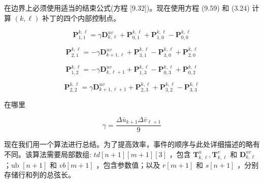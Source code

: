 \documentclass[../main.tex]{subfiles}
\begin{document}
在边界上必须使用适当的结束公式(方程 [9.32])。现在使用方程 (9.59) 和 (3.24) 计算 \(\left( {k,\ell }\right)\) 补丁的四个内部控制点。

\[
{\mathbf{P}}_{1,1}^{k,\ell } = \gamma {\mathbf{D}}_{k,\ell }^{uv} + {\mathbf{P}}_{0,1}^{k,\ell } + {\mathbf{P}}_{1,0}^{k,\ell } - {\mathbf{P}}_{0,0}^{k,\ell }
\]

\[
{\mathbf{P}}_{2,1}^{k,\ell } =  - \gamma {\mathbf{D}}_{k + 1,\ell }^{uv} + {\mathbf{P}}_{3,1}^{k,\ell } - {\mathbf{P}}_{3,0}^{k,\ell } + {\mathbf{P}}_{2,0}^{k,\ell }
\]

\[
{\mathbf{P}}_{1,2}^{k,\ell } =  - \gamma {\mathbf{D}}_{k,\ell  + 1}^{uv} + {\mathbf{P}}_{1,3}^{k,\ell } - {\mathbf{P}}_{0,3}^{k,\ell } + {\mathbf{P}}_{0,2}^{k,\ell }
\]

\[
{\mathbf{P}}_{2,2}^{k,\ell } = \gamma {\mathbf{D}}_{k + 1,\ell  + 1}^{uv} + {\mathbf{P}}_{2,3}^{k,\ell } + {\mathbf{P}}_{3,2}^{k,\ell } - {\mathbf{P}}_{3,3}^{k,\ell }
\]

在哪里

\[
\gamma  = \frac{\Delta {\bar{u}}_{k + 1}\Delta {\bar{v}}_{\ell  + 1}}{9}
\]

现在我们用一个算法进行总结。为了提高效率，事件的顺序与此处详细描述的略有不同。该算法需要局部数组: \({td}\left\lbrack  {n + 1}\right\rbrack  \left\lbrack  {m + 1}\right\rbrack  \left\lbrack  3\right\rbrack\) ，包含 \({\mathbf{T}}_{k,\ell }^{u},{\mathbf{T}}_{k,\ell }^{v}\) 和 \({\mathbf{D}}_{k,\ell }^{uv}\) ；ub \(\left\lbrack  {n + 1}\right\rbrack\) 和 \({vb}\left\lbrack  {m + 1}\right\rbrack\) ，包含参数值；以及 \(r\left\lbrack  {m + 1}\right\rbrack\) 和 \(s\left\lbrack  {n + 1}\right\rbrack\) ，分别存储行和列的总弦长。
\end{document}
